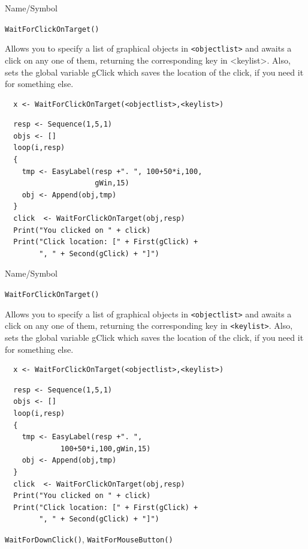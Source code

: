 \begin{desc}{Name/Symbol}
\item[Name/Symbol]  	\verb+WaitForClickOnTarget()+

\item[Description]	
  Allows you to specify a list of graphical objects in \verb+<objectlist>+ and awaits a click
  on any one of them, returning the corresponding key in <keylist>.  Also, sets the 
  global variable gClick which saves the location of the click, if 
  you need it for something else.
\item[Usage]		
\begin{verbatim}
  x <- WaitForClickOnTarget(<objectlist>,<keylist>)
\end{verbatim}

\item[Example]	

\begin{verbatim}
  resp <- Sequence(1,5,1)
  objs <- []
  loop(i,resp)
  {
    tmp <- EasyLabel(resp +". ", 100+50*i,100,
                     gWin,15)
    obj <- Append(obj,tmp)
  }
  click  <- WaitForClickOnTarget(obj,resp)
  Print("You clicked on " + click)
  Print("Click location: [" + First(gClick) + 
        ", " + Second(gClick) + "]")
\end{verbatim}
\item[See Also]	
\end{desc}




\begin{desc}{Name/Symbol}
\item[Name/Symbol]  	\verb+WaitForClickOnTarget()+

\item[Description]	
  Allows you to specify a list of graphical objects in \verb+<objectlist>+ and awaits a click
  on any one of them, returning the corresponding key in \verb+<keylist>+.  Also, sets the 
  global variable gClick which saves the location of the click, if 
  you need it for something else.
\item[Usage]		
\begin{verbatim}
  x <- WaitForClickOnTarget(<objectlist>,<keylist>)
\end{verbatim}

\item[Example]	

\begin{verbatim}
  resp <- Sequence(1,5,1)
  objs <- []
  loop(i,resp)
  {
    tmp <- EasyLabel(resp +". ",
             100+50*i,100,gWin,15)
    obj <- Append(obj,tmp)
  }
  click  <- WaitForClickOnTarget(obj,resp)
  Print("You clicked on " + click)
  Print("Click location: [" + First(gClick) + 
        ", " + Second(gClick) + "]")
\end{verbatim}
\item[See Also]	
  \verb+WaitForDownClick()+, \verb+WaitForMouseButton()+
\end{desc}






